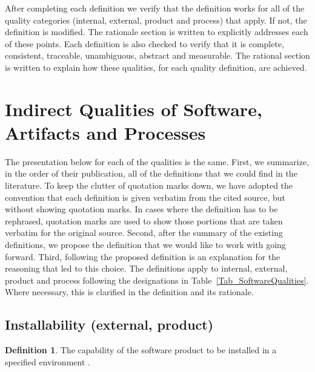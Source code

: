 \documentclass[letterpaper, cleveref]{lipics-v2019}
\newcommand{\authornote}[3]{\textcolor{#1}{[#3 ---#2]}}
\newcommand{\authornote}[3]{}
\newcommand{\oo}[1]{\authornote{magenta}{OO}{#1}} %
\theoremstyle{definition}
\newtheorem{defn}{Definition}
\begin{document}
After completing each definition we verify that the definition works for all of
the quality categories (internal, external, product and process) that apply.  If
not, the definition is modified.  The rationale section is written to explicitly
addresses each of these points.  Each definition is also checked to verify that
it is complete, consistent, traceable, unambiguous, abstract and measurable.
The rational section is written to explain how these qualities, for each quality
definition, are achieved.


\section{Indirect Qualities of Software, Artifacts and Processes}
\label{SecQualities}

The presentation below for each of the qualities is the same.  First, we
summarize, in the order of their publication, all of the definitions that we
could find in the literature.  To keep the clutter of quotation marks down, we
have adopted the convention that each definition is given verbatim from the
cited source, but without showing quotation marks.  In cases where the
definition has to be rephrased, quotation marks are used to show those portions
that are taken verbatim for the original source.  Second, after the summary of
the existing definitions, we propose the definition that we would like to work
with going forward. Third, following the proposed definition is an explanation
for the reasoning that led to this choice.  The definitions apply to internal,
external, product and process following the designations in
Table~\ref{Tab_SoftwareQualities}. Where necessary, this is clarified in the
definition and its rationale.


\subsection{Installability (external, product)} %

\begin{defn} \label{Installability_ISO9126}
  The capability of the software product to be installed in a specified
  environment \citep{ISO9126}. %
\end{defn}
\end{document}
